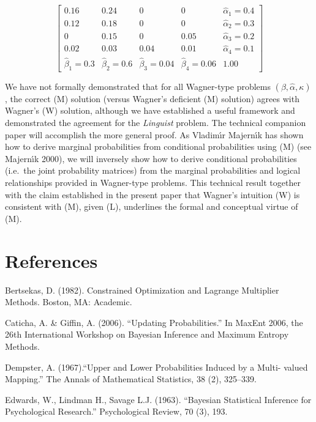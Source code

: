 \documentclass[11pt]{article}
\begin{document}
\begin{equation}
  \label{eq:p11}
      \left[
      \begin{array}{ccccc}
        0.16 & 0.24 & 0 & 0 & \hat{\alpha}_{1}=0.4 \\
        0.12 & 0.18 & 0 & 0 & \hat{\alpha}_{2}=0.3 \\
        0 & 0.15 & 0 & 0.05 & \hat{\alpha}_{3}=0.2 \\
        0.02 & 0.03 & 0.04 & 0.01 & \hat{\alpha}_{4}=0.1 \\
        \hat{\beta}_{1}=0.3 & \hat{\beta}_{2}=0.6 & \hat{\beta}_{3}=0.04 & \hat{\beta}_{4}=0.06 & 1.00
      \end{array}
\right]
\end{equation}

We have not formally demonstrated that for all Wagner-type problems
$(\beta,\hat{\alpha},\kappa)$, the correct (M) solution (versus
Wagner's deficient (M) solution) agrees with Wagner's (W) solution,
although we have established a useful framework and demonstrated the
agreement for the \emph{Linguist} problem. The technical companion
paper will accomplish the more general proof. As Vladim{\'\i}r
Majern{\'\i}k has shown how to derive marginal probabilities from
conditional probabilities using (M) (see Majern{\'\i}k 2000), we
will inversely show how to derive conditional probabilities (i.e.\ the
joint probability matrices) from the marginal probabilities and
logical relationships provided in Wagner-type problems. This technical
result together with the claim established in the present paper that
Wagner's intuition (W) is consistent with (M), given (L), underlines
the formal and conceptual virtue of (M).

\section{References}
\label{References}

Bertsekas, D. (1982). Constrained Optimization and Lagrange Multiplier Methods. Boston, MA: Academic.

Caticha, A. \& Giffin, A. (2006). ``Updating Probabilities.'' In MaxEnt 2006, the 26th International Workshop on Bayesian Inference and Maximum Entropy Methods.

Dempster, A. (1967).``Upper and Lower Probabilities Induced by a Multi- valued Mapping.'' The Annals of Mathematical Statistics, 38 (2), 325--339.

Edwards, W., Lindman H., Savage L.J. (1963). ``Bayesian Statistical Inference for Psychological Research.'' Psychological Review, 70 (3), 193.
\end{document}
